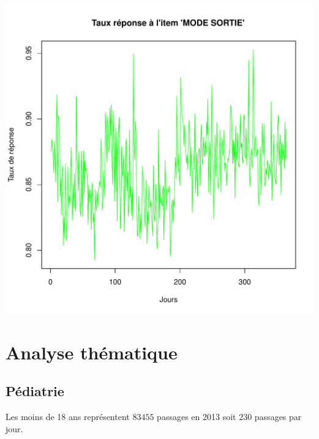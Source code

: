 \documentclass[12pt,english,french,twoside]{book}\usepackage[]{graphicx}\usepackage[]{color}
\makeatletter
\def\maxwidth{ %
  \ifdim\Gin@nat@width>\linewidth
    \linewidth
  \else
    \Gin@nat@width
  \fi
}
\makeatother
\begin{document}
\includegraphics[width=\maxwidth]{figure/retour_dom3-1} 




\part{Analyse thématique} 
\newpage

\chapter{Pédiatrie}

\label{chap_pediatrie}



Les moins de 18 ans représentent $83 455$ passages en 2013 soit $230$ passages par jour.

\end{document}
